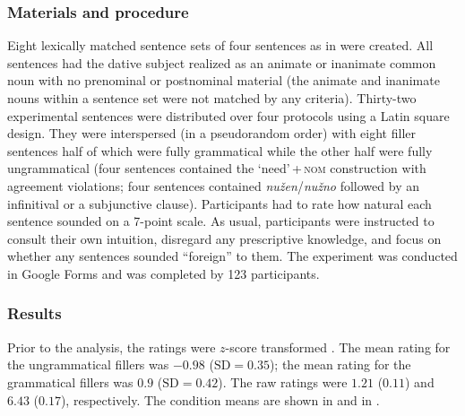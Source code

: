 \documentclass[output=paper]{langscibook}
\begin{document}
\subsubsection{Materials and procedure}

Eight lexically matched sentence sets of four sentences as in  were created. All sentences had the dative subject realized as an animate or inanimate common noun with no prenominal or postnominal material (the animate and inanimate nouns within a sentence set were not matched by any criteria). Thirty-two experimental sentences were distributed over four protocols using a Latin square design. They were interspersed (in a pseudorandom order) with eight filler sentences half of which were fully grammatical while the other half were fully ungrammatical (four sentences contained the `need'\,+\,\textsc{nom} construction with agreement violations; four sentences contained \textit{nužen}/\textit{nužno} followed by an infinitival or a subjunctive clause). Participants had to rate how natural each sentence sounded on a 7-point scale. As usual, participants were instructed to consult their own intuition, disregard any prescriptive knowledge, and focus on whether any sentences sounded ``foreign'' to them. The experiment was conducted in Google Forms and was completed by 123 participants.

\subsubsection{Results}

Prior to the analysis, the ratings were $z$-score transformed \citep[see][]{Schuetze.Sprouse2014}. The mean rating for the ungrammatical fillers was $-0.98$ ($\text{SD}=0.35$); the mean rating for the grammatical fillers was $0.9$ ($\text{SD} =0.42$). The raw ratings were $1.21$ ($0.11$) and $6.43$ ($0.17$), respectively. The condition means are shown in  and in .

\end{document}
